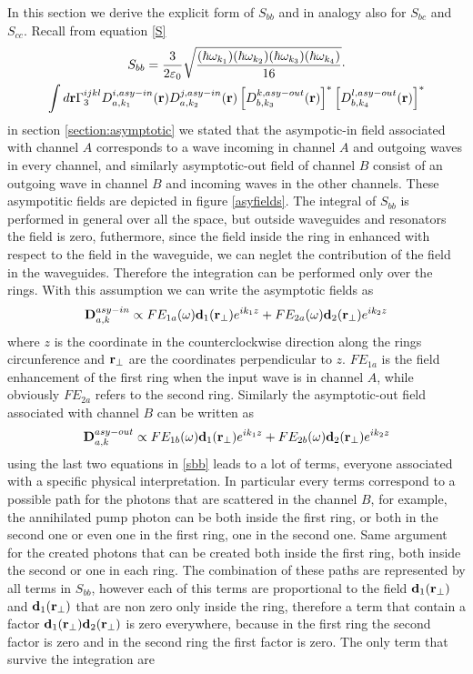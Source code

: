 In this section we derive the explicit form of $S_{bb}$ and in analogy also for $S_{bc}$ and $S_{cc}$. Recall from equation \eqref{S}
\begin{multline}\label{sbb} S_{bb} =\frac{3}{2\varepsilon_0}\sqrt{\frac{(\hbar\omega_{k_1})(\hbar\omega_{k_2})(\hbar\omega_{k_3})(\hbar\omega_{k_4})}{16}}\cdot \\ \int d\mathbf{r} \Gamma^{ijkl}_3D^{i,asy-in}_{a,k_1}(\mathbf{r})D^{j,asy-in}_{a,k_2}(\mathbf{r})\left[D^{k,asy-out}_{b,k_3}(\mathbf{r})\right]^*\left[D^{l,asy-out}_{b,k_4}(\mathbf{r})\right]^*\end{multline}
in section \ref{section:asymptotic} we stated that the asympotic-in field associated with channel $A$ corresponds to a wave incoming in channel $A$ and outgoing waves in every channel, and similarly asymptotic-out field of channel $B$ consist of an outgoing wave in channel $B$ and incoming waves in the other channels. These asympotitic fields are depicted in figure \ref{asyfields}. The integral of $S_{bb}$ is performed in general over all the space, but outside waveguides and resonators the field is zero, futhermore, since the field inside the ring in enhanced with respect to the field in the waveguide, we can neglet the contribution of the field in the waveguides. Therefore the integration can be performed only over the rings. With this assumption we can write the asymptotic fields as
\[\mathbf{D}^{asy-in}_{a,k} \propto FE_{1a}(\omega) \mathbf{d}_1(\mathbf{r}_\perp)e^{ik_1z} + FE_{2a}(\omega) \mathbf{d}_2(\mathbf{r}_\perp)e^{ik_2z} \]
where $z$ is the coordinate in the counterclockwise direction along the rings circunference and $\mathbf{r}_\perp$ are the coordinates perpendicular to $z$. $FE_{1a}$ is the field enhancement of the first ring when the input wave is in channel $A$, while obviously $FE_{2a}$ refers to the second ring. Similarly the asymptotic-out field associated with channel $B$ can be written as
\[\mathbf{D}^{asy-out}_{a,k} \propto FE_{1b}(\omega) \mathbf{d}_1(\mathbf{r}_\perp)e^{ik_1z} + FE_{2b}(\omega) \mathbf{d}_2(\mathbf{r}_\perp)e^{ik_2z} \]
using the last two equations in \eqref{sbb} leads to a lot of terms, everyone associated with a specific physical interpretation. In particular every terms correspond to a possible path for the photons that are scattered in the channel $B$, for example, the annihilated pump photon can be both inside the first ring, or both in the second one or even one in the first ring, one in the second one. Same argument for the created photons that can be created both inside the first ring, both inside the second or one in each ring. The combination of these paths are represented by all terms in $S_{bb}$, however each of this terms are proportional to the field $\mathbf{d}_1(\mathbf{r}_{\perp})$ and $\mathbf{d}_1(\mathbf{r}_{\perp})$ that are non zero only inside the ring, therefore a term that contain a factor $\mathbf{d}_1(\mathbf{r}_{\perp})\mathbf{d}_2(\mathbf{r}_{\perp})$ is zero everywhere, because in the first ring the second factor is zero and in the second ring the first factor is zero. The only term that survive the integration are 
